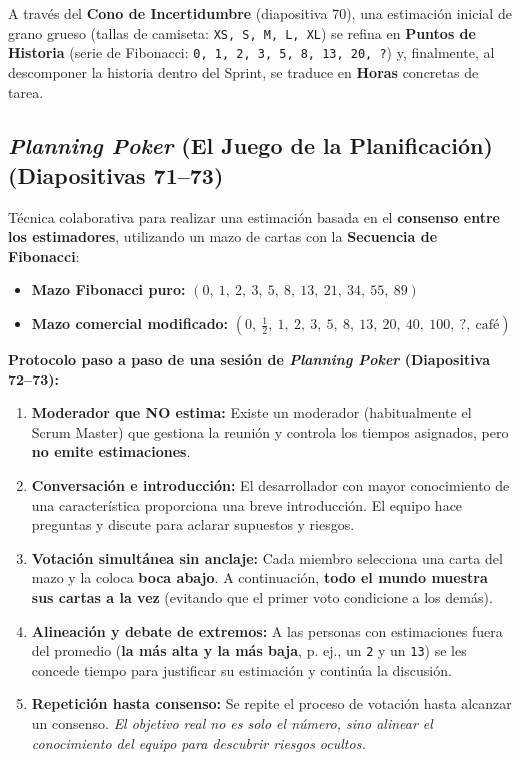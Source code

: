 A través del \textbf{Cono de Incertidumbre} (diapositiva 70), una estimación inicial de grano grueso (tallas de camiseta: \texttt{XS, S, M, L, XL}) se refina en \textbf{Puntos de Historia} (serie de Fibonacci: \texttt{0, 1, 2, 3, 5, 8, 13, 20, ?}) y, finalmente, al descomponer la historia dentro del Sprint, se traduce en \textbf{Horas} concretas de tarea.

\subsection{\textit{Planning Poker} (El Juego de la Planificación) (Diapositivas 71--73)}

\begin{definicion}
Técnica colaborativa para realizar una estimación basada en el \textbf{consenso entre los estimadores}, utilizando un mazo de cartas con la \textbf{Secuencia de Fibonacci}:
\begin{itemize}[itemsep=2pt]
    \item \textbf{Mazo Fibonacci puro:} $(0,\ 1,\ 2,\ 3,\ 5,\ 8,\ 13,\ 21,\ 34,\ 55,\ 89)$
    \item \textbf{Mazo comercial modificado:} $(0,\ \tfrac{1}{2},\ 1,\ 2,\ 3,\ 5,\ 8,\ 13,\ 20,\ 40,\ 100,\ ?,\ \text{café})$
\end{itemize}
\end{definicion}

\textbf{Protocolo paso a paso de una sesión de \textit{Planning Poker} (Diapositiva 72--73):}
\begin{enumerate}[label=\textbf{\arabic*.}, itemsep=3pt]
    \item \textbf{Moderador que NO estima:} Existe un moderador (habitualmente el Scrum Master) que gestiona la reunión y controla los tiempos asignados, pero \textbf{no emite estimaciones}.
    \item \textbf{Conversación e introducción:} El desarrollador con mayor conocimiento de una característica proporciona una breve introducción. El equipo hace preguntas y discute para aclarar supuestos y riesgos.
    \item \textbf{Votación simultánea sin anclaje:} Cada miembro selecciona una carta del mazo y la coloca \textbf{boca abajo}. A continuación, \textbf{todo el mundo muestra sus cartas a la vez} (evitando que el primer voto condicione a los demás).
    \item \textbf{Alineación y debate de extremos:} A las personas con estimaciones fuera del promedio (\textbf{la más alta y la más baja}, p. ej., un \texttt{2} y un \texttt{13}) se les concede tiempo para justificar su estimación y continúa la discusión.
    \item \textbf{Repetición hasta consenso:} Se repite el proceso de votación hasta alcanzar un consenso. \textit{El objetivo real no es solo el número, sino alinear el conocimiento del equipo para descubrir riesgos ocultos.}
\end{enumerate}

